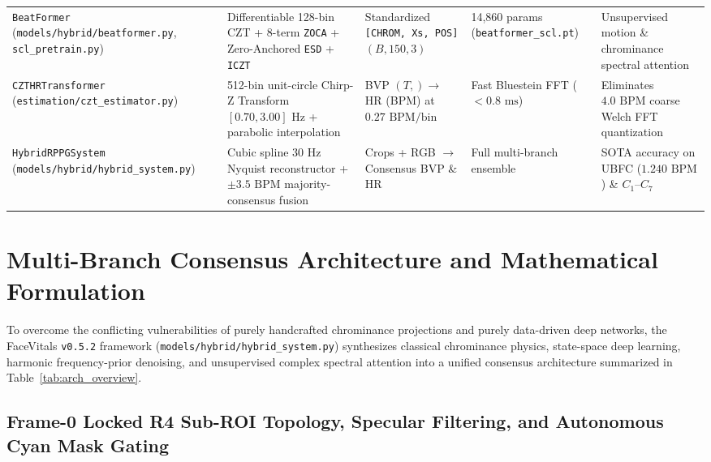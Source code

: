 \documentclass[conference]{IEEEtran}
\begin{document}
\begin{table}[t]
{\begin{tabular}{@{}lllll@{}}
\texttt{BeatFormer} (\texttt{models/hybrid/beatformer.py}, \texttt{scl\_pretrain.py}) & Differentiable 128-bin CZT + 8-term \texttt{ZOCA} + Zero-Anchored \texttt{ESD} + \texttt{ICZT} & Standardized \texttt{[CHROM, Xs, POS]} $(B,150,3)$ & 14,860 params (\texttt{beatformer\_scl.pt}) & Unsupervised motion \& chrominance spectral attention \\
\texttt{CZTHRTransformer} (\texttt{estimation/czt\_estimator.py}) & 512-bin unit-circle Chirp-Z Transform $[0.70,3.00]\text{ Hz}$ + parabolic interpolation & BVP $(T,) \to$ HR (BPM) at $0.27\text{ BPM/bin}$ & Fast Bluestein FFT ($<0.8\text{ ms}$) & Eliminates $4.0\text{ BPM}$ coarse Welch FFT quantization \\
\texttt{HybridRPPGSystem} (\texttt{models/hybrid/hybrid\_system.py}) & Cubic spline $30\text{ Hz}$ Nyquist reconstructor + $\pm 3.5\text{ BPM}$ majority-consensus fusion & Crops + RGB $\to$ Consensus BVP \& HR & Full multi-branch ensemble & SOTA accuracy on UBFC ($1.240\text{ BPM}$) \& $C_1\text{--}C_7$ \\
\bottomrule
\end{tabular}%
}
\end{table}

\section{Multi-Branch Consensus Architecture and Mathematical Formulation}

To overcome the conflicting vulnerabilities of purely handcrafted chrominance projections and purely data-driven deep networks, the FaceVitals \texttt{v0.5.2} framework (\texttt{models/hybrid/hybrid\_system.py}) synthesizes classical chrominance physics, state-space deep learning, harmonic frequency-prior denoising, and unsupervised complex spectral attention into a unified consensus architecture summarized in Table~\ref{tab:arch_overview}.

\subsection{Frame-0 Locked R4 Sub-ROI Topology, Specular Filtering, and Autonomous Cyan Mask Gating}
\end{document}
